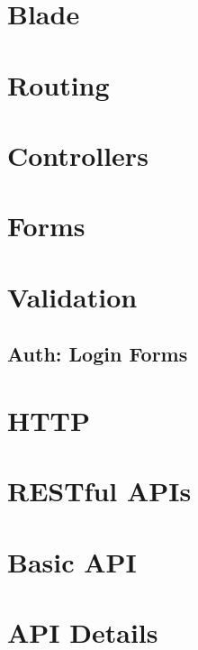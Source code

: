 \documentclass[b5paper,openany]{book}
\begin{document}
\chapter{Blade}


\chapter{Routing}


\chapter{Controllers}


\chapter{Forms}


\chapter{Validation}


\begin{readonly}
    \chapter{Auth: Login Forms}
    
\end{readonly}

\chapter{HTTP}


\chapter{RESTful APIs}


\chapter{Basic API}


\chapter{API Details}

\end{document}
